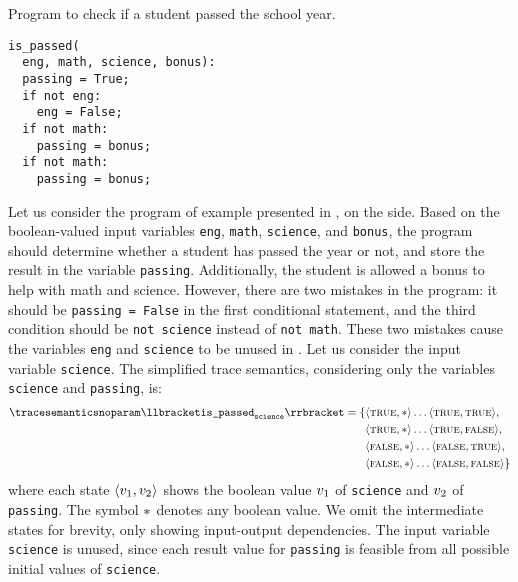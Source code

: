 \begin{example}
\begin{marginlisting}
  \caption{Program to check if a student passed the school year.}
  \vspace{10pt}
\begin{lstlisting}
is_passed(
  eng, math, science, bonus):
  passing = True;
  if not eng:
    eng = False;
  if not math:
    passing = bonus;
  if not math:
    passing = bonus;
\end{lstlisting}
\end{marginlisting}
Let us consider the program of example presented in , on the side.
Based on the boolean-valued input variables \texttt{eng}, \texttt{math}, \texttt{science}, and \texttt{bonus}, the program should determine whether a student has passed the year or not, and store the result in the variable \texttt{passing}. Additionally, the student is allowed a bonus to help with math and science.
However, there are two mistakes in the program: it should be \texttt{passing = False} in the first conditional statement, and the third condition should be \texttt{not science} instead of \texttt{not math}.
These two mistakes cause the variables \texttt{eng} and \texttt{science} to be unused in .
Let us consider the input variable \texttt{science}.
The simplified trace semantics, considering only the variables \texttt{science} and \texttt{passing}, is:
\begin{align*}
  \tracesemanticsnoparam\semanticsof{\texttt{is\_passed}_\texttt{science}}
  =
  \{
    &\tuple\true\anyvalue\dots\tuple\true\true, \\
    &\tuple\true\anyvalue\dots\tuple\true\false, \\
    &\tuple\false\anyvalue\dots\tuple\false\true, \\
    &\tuple\false\anyvalue\dots\tuple\false\false
  \}
\end{align*}
where each state $\langle v_1, v_2 \rangle$ shows the boolean value $v_1$ of \texttt{science} and $v_2$ of \texttt{passing}. The symbol ${*}$ denotes any boolean value. We omit the intermediate states for brevity, only showing input-output dependencies.
The input variable \texttt{science} is unused, since each result value for \texttt{passing} is feasible from all possible initial values of \texttt{science}.


\end{example}

